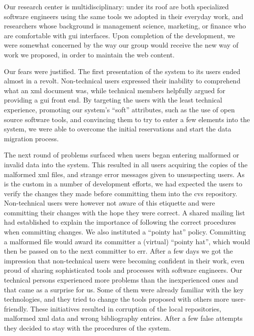 \documentclass[10pt]{article}
\begin{document}
Our research center is multidisciplinary: under its roof
are both specialized software engineers using the same tools
we adopted in their everyday work, and researchers whose
background is management science, marketing, or finance
who are comfortable with {\sc gui} interfaces.
Upon completion of the development, we were somewhat concerned by the way our group
would receive the new way of work we proposed, in order to maintain the web content.

Our fears were justified.
The first presentation of the system to its users ended
almost in a revolt.
Non-technical users expressed their inability to comprehend
what an {\sc xml} document was, while technical members
helpfully argued for providing a {\sc gui} front end.
By targeting the users with the least technical experience,
promoting our system's ``soft'' attributes,
such as the use of open source software tools,
and convincing them to try to enter a few elements into
the system, we were able to overcome the initial reservations
and start the data migration process.

The next round of problems surfaced when users began entering
malformed or invalid data into the system.
This resulted in all users acquiring the copies of the malformed
{\sc xml} files, and strange error messages given to unsuspecting
users.
As is the custom in a number of development efforts, we had
expected the users to verify the changes they made before
committing them into the {\sc cvs} repository.
Non-technical users were however not aware of this etiquette
and were committing their changes with the hope they were correct.
A shared mailing list had established to explain the
importance of following the correct procedures when committing changes.
We also instituted a ``pointy hat'' policy. Committing a malformed file would award 
its committer a (virtual) ``pointy hat'', which would then be passed on to the next committer to err.
After a few days we got the impression that non-technical users
were becoming confident in their work, even proud of sharing
sophisticated tools and processes with software engineers.
Our technical persons experienced more problems than the inexperienced ones 
and that came as a surprise for us. Some of them were already familiar 
with the key technologies, and they tried to change the tools proposed with others 
more user-friendly. 
These initiatives resulted in corruption of the local repositories, malformed 
{\sc xml} data and wrong bibliography entries.
After a few false attempts they decided to stay with the procedures of the system.
\end{document}
